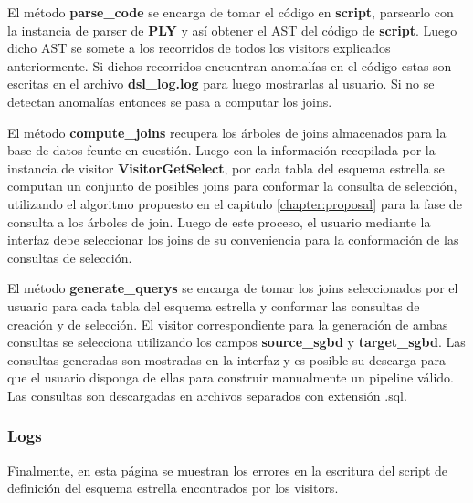 El m\'etodo \textbf{parse\_code} se encarga de tomar el c\'odigo en \textbf{script}, parsearlo 
con la instancia de parser de \textbf{PLY} y as\'i obtener el AST del c\'odigo de \textbf{script}. 
Luego dicho AST se somete a los recorridos de todos los visitors explicados anteriormente. Si dichos 
recorridos encuentran anomal\'ias en el c\'odigo estas son escritas en el archivo \textbf{dsl\_log.log} 
para luego mostrarlas al usuario. Si no se detectan anomal\'ias entonces se pasa a computar los joins. 

El m\'etodo \textbf{compute\_joins} recupera los \'arboles de joins almacenados para la base de datos 
feunte en cuesti\'on. Luego con la informaci\'on recopilada por la instancia de visitor \textbf{VisitorGetSelect}, 
por cada tabla del esquema estrella se computan un conjunto de posibles joins para conformar la consulta 
de selecci\'on, utilizando el algoritmo propuesto en el capitulo \ref{chapter:proposal} para la fase 
de consulta a los \'arboles de join. Luego de este proceso, el usuario mediante la interfaz debe seleccionar 
los joins de su conveniencia para la conformaci\'on de las consultas de selecci\'on. 

El m\'etodo \textbf{generate\_querys} se encarga de tomar los joins seleccionados por el usuario para 
cada tabla del esquema estrella y conformar las consultas de creaci\'on y de selecci\'on. El visitor 
correspondiente para la generaci\'on de ambas consultas se selecciona utilizando los campos 
\textbf{source\_sgbd} y \textbf{target\_sgbd}. Las consultas generadas son mostradas en la interfaz y es 
posible su descarga para que el usuario disponga de ellas para construir manualmente un pipeline v\'alido. 
Las consultas son descargadas en archivos separados con extensi\'on .sql.

\subsubsection{Logs}

Finalmente, en esta p\'agina se muestran los errores en la escritura del script de definici\'on del esquema
estrella encontrados por los visitors.